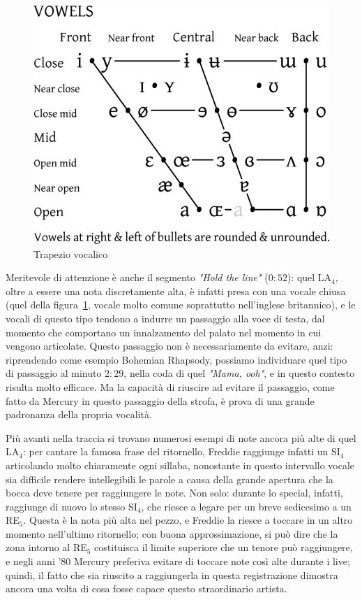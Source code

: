 \documentclass[12pt]{article}
\begin{document}
\begin{figure}
 \includegraphics[width=\linewidth]{vox/vowels}
 \caption{Trapezio vocalico}
 \label{fig:vowels}
 \hspace{1cm}
 \centering
\end{figure}

Meritevole di attenzione è anche il segmento \emph{"Hold the line"} (\(0:52\)): quel LA\(_{4}\), oltre a essere una nota discretamente alta, è infatti presa con una vocale chiusa (quel  della figura~\ref{fig:vowels}, vocale molto comune soprattutto nell'inglese britannico), e le vocali di questo tipo tendono a indurre un passaggio alla voce di testa, dal momento che comportano un innalzamento del palato nel momento in cui vengono articolate. Questo passaggio non è necessariamente da evitare, anzi: riprendendo come esempio Bohemian Rhapsody, possiamo individuare quel tipo di passaggio al minuto \(2:29\), nella coda di quel \emph{"Mama, ooh"}, e in questo contesto risulta molto efficace. Ma la capacità di riuscire ad evitare il passaggio, come fatto da Mercury in questo passaggio della strofa, è prova di una grande padronanza della propria vocalità.

Più avanti nella traccia si trovano numerosi esempi di note ancora più alte di quel LA\(_{4}\): per cantare la famosa frase del ritornello, Freddie raggiunge infatti un SI\(_{4}\) articolando molto chiaramente ogni sillaba, nonostante in questo intervallo vocale sia difficile rendere intellegibili le parole a causa della grande apertura che la bocca deve tenere per raggiungere le note. Non solo: durante lo special, infatti, raggiunge di nuovo lo stesso SI\(_{4}\), che riesce a legare per un breve sedicesimo a un RE\(_{5}\). Questa è la nota più alta nel pezzo, e Freddie la riesce a toccare in un altro momento nell'ultimo ritornello; con buona approssimazione, si può dire che la zona intorno al RE\(_{5}\) costituisca il limite superiore che un tenore può raggiungere, e negli anni '\(80\) Mercury preferiva evitare di toccare note così alte durante i live; quindi, il fatto che sia riuscito a raggiungerla in questa registrazione dimostra ancora una volta di cosa fosse capace questo straordinario artista.
\end{document}
